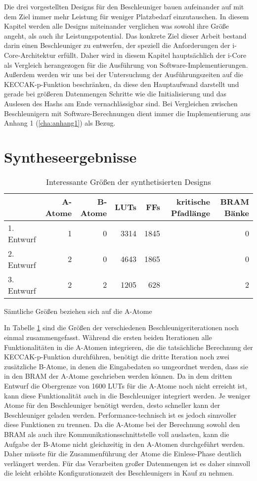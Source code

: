Die drei vorgestellten Designs für den Beschleuniger bauen aufeinander auf mit dem Ziel immer mehr Leistung für weniger Platzbedarf einzutauschen.
In diesem Kapitel werden alle Designs miteinander verglichen was sowohl ihre Größe angeht, als auch ihr Leistungspotential.
Das konkrete Ziel dieser Arbeit bestand darin einen Beschleuniger zu entwerfen, der speziell die Anforderungen der i-Core-Architektur erfüllt.
Daher wird in diesem Kapitel hauptsächlich der i-Core als Vergleich herangezogen für die Ausführung von Software-Implementierungen.
Außerdem werden wir uns bei der Untersuchung der Ausführungszeiten auf die KECCAK-p-Funktion beschränken,
da diese den Hauptaufwand darstellt und gerade bei größeren Datenmengen Schritte wie die Initialisierung und das Auslesen des Hashs am Ende vernachlässigbar sind.
Bei Vergleichen zwischen Beschleunigern mit Software-Berechnungen dient immer die Implementierung aus Anhang 1 (\ref{cha:anhang1}) als Bezug.

\section{Syntheseergebnisse}
\begin{table}
    \centering
    \begin{tabular}{lrrrrrr}
    & A-Atome & B-Atome & LUTs & FFs & kritische Pfadlänge & BRAM Bänke \\
    \hline
    1. Entwurf & 1 & 0 & 3314 & 1845 & \comment{?} & 0 \\
    2. Entwurf & 2 & 0 & 4643 & 1865 & \comment{?} & 0 \\
    3. Entwurf & 2 & 2 & 1205 & 628 & \comment{?} & 2
    \end{tabular}
    \label{tab:synth_ergebniss}
    \caption{Interessante Größen der synthetisierten Designs}
    \small
    Sämtliche Größen beziehen sich auf die A-Atome
\end{table}
In Tabelle \ref{tab:synth_ergebniss} sind die Größen der verschiedenen Beschleunigeriterationen noch einmal zusammengefasst.
Während die ersten beiden Iterationen alle Funktionalitäten in die A-Atomen integrieren, die die tatsächliche Berechnung der KECCAK-p-Funktion durchführen,
benötigt die dritte Iteration noch zwei zusätzliche B-Atome, in denen die Eingabedaten so umgeordnet werden, dass sie in den BRAM der A-Atome geschrieben werden können.
Da in dem dritten Entwurf die Obergrenze von 1600 LUTs für die A-Atome noch nicht erreicht ist, kann diese Funktionalität auch in die Beschleuniger integriert werden.
Je weniger Atome für den Beschleuniger benötigt werden, desto schneller kann der Beschleuniger geladen werden.
Performance-technisch ist es jedoch sinnvoller diese Funktionen zu trennen. Da die A-Atome bei der Berechnung sowohl den BRAM als auch ihre Kommunikationsschnittstelle
voll auslasten, kann die Aufgabe der B-Atome nicht gleichzeitig in den A-Atomen durchgeführt werden. Daher müsste für die Zusammenführung der Atome die Einlese-Phase deutlich verlängert werden.
Für das Verarbeiten großer Datenmengen ist es daher sinnvoll die leicht erhöhte Konfigurationszeit des Beschleunigers in Kauf zu nehmen.

